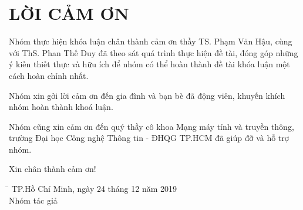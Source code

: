 \documentclass[../main-report.tex]{subfiles}
\begin{document}
\part*{LỜI CẢM ƠN}
Nhóm thực hiện khóa luận chân thành cảm ơn thầy TS. Phạm Văn Hậu, cùng với ThS. Phan Thế Duy đã  theo sát quá trình thực hiện đề tài, đóng góp những ý kiến thiết thực và hữu ích để nhóm có thể hoàn thành đề tài khóa luận một cách hoàn chỉnh nhất.

Nhóm xin gởi lời cảm ơn đến gia đình và bạn bè đã động viên, khuyến khích nhóm hoàn thành khoá luận.

Nhóm cũng xin cảm ơn đến quý thầy cô khoa Mạng máy tính và truyền thông, trường Đại học Công nghệ Thông tin - ĐHQG TP.HCM đã giúp đỡ và hỗ trợ nhóm.

Xin chân thành cảm ơn!

\begin{tabbing}
\hspace{7cm}\=\kill
  \> TP.Hồ Chí Minh, ngày 24 tháng 12 năm 2019 \\
  \> \hspace{2.2cm} Nhóm tác giả
\end{tabbing} 
\end{document}
